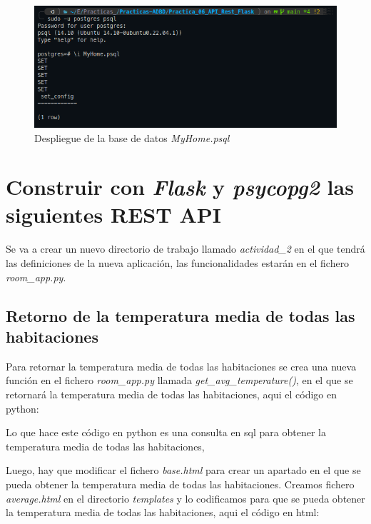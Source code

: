 \documentclass[11pt]{report}
\begin{document}
\begin{figure}[H]
  \centering
  \includegraphics[scale=0.5]{img/myhome_script.png}
  \caption{Despliegue de la base de datos \emph{MyHome.psql}}
\end{figure}

\section{Construir con \emph{Flask} y \emph{psycopg2} las siguientes REST API}
Se va a crear un nuevo directorio de trabajo llamado \emph{actividad\_2} en el que tendrá las definiciones de la nueva
aplicación, las funcionalidades estarán en el fichero \emph{room\_app.py}.

\subsection{Retorno de la temperatura media de todas las habitaciones}
Para retornar la temperatura media de todas las habitaciones se crea una nueva función en el fichero \emph{room\_app.py}
llamada \emph{get\_avg\_temperature()}, en el que se retornará la temperatura media de todas las habitaciones, aqui el
código en python:
\lstset{style=mystyle}


Lo que hace este código en python es una consulta en sql para obtener la temperatura media de todas las habitaciones,
\lstset{style=mystyle}


Luego, hay que modificar el fichero \emph{base.html} para crear un apartado en el que se pueda obtener la temperatura
media de todas las habitaciones. Creamos fichero \emph{average.html} en el directorio \emph{templates} y
lo codificamos para que se pueda obtener la temperatura media de todas las habitaciones, aqui el código en html:
\lstset{style=mystyle}

\end{document}
